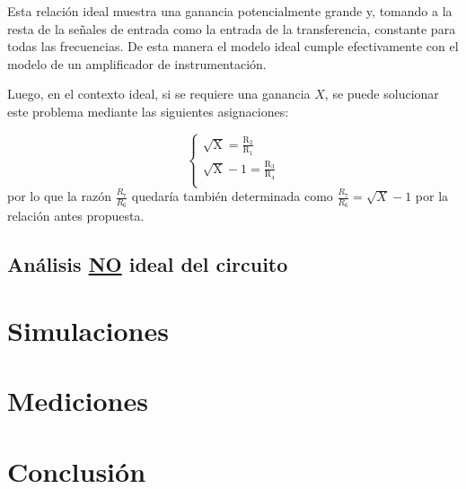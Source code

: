 \documentclass[../../tc_tp3_main.tex]{subfiles}
\begin{document}

Esta relación ideal muestra una ganancia potencialmente grande y, tomando a la resta de la señales de entrada como la entrada de la transferencia, constante para todas las frecuencias. De esta manera el modelo ideal cumple efectivamente con el modelo de un amplificador de instrumentación.\par

Luego, en el contexto ideal, si se requiere una ganancia $X$, se puede solucionar este problema mediante las siguientes asignaciones: \par
 	\begin{equation}
  	   \left\{
	  	    \begin{array}{ll}
		 					\mathrm{\sqrt{X} = \frac{R_2}{R_1} } \\
			 				\mathrm{\sqrt{X} - 1 = \frac{R_3}{R_4}} \\
	     	 \end{array}
	     	\right.
 	\end{equation}
 	por lo que la razón $\frac{R_7}{R_6}$ quedaría también determinada como $\frac{R_7}{R_6} = \sqrt{X} - 1$ por la relación antes propuesta.

\subsection{Análisis \underline{NO} ideal del circuito}
\section{Simulaciones}

\section{Mediciones}

\section{Conclusión}
\end{document}
